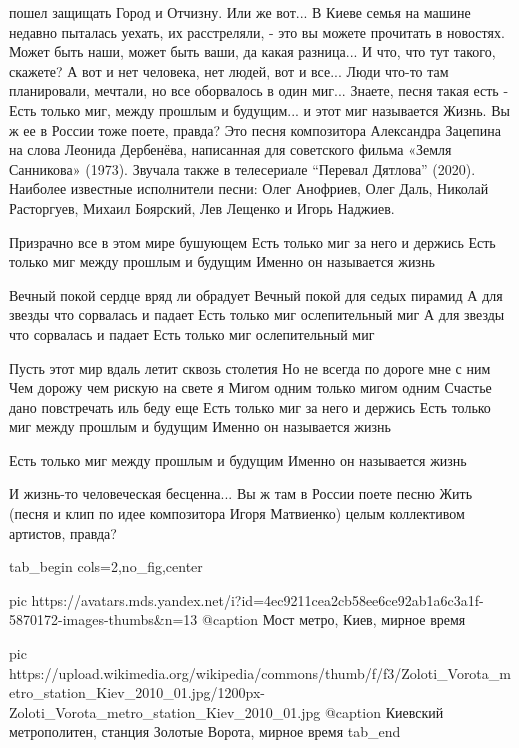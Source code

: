 пошел защищать Город и Отчизну. Или же вот... В Киеве семья на машине недавно
пыталась уехать, их расстреляли, - это вы можете прочитать в новостях. Может
быть наши, может быть ваши, да какая разница... И что, что тут такого, скажете?
А вот и нет человека, нет людей, вот и все... Люди что-то там планировали,
мечтали, но все оборвалось в один миг...  Знаете, песня такая есть - Есть
только миг, между прошлым и будущим... и этот миг называется Жизнь. Вы ж ее в
России тоже поете, правда?  Это песня композитора Александра Зацепина на слова
Леонида Дербенёва, написанная для советского фильма «Земля Санникова» (1973).
Звучала также в телесериале \enquote{Перевал Дятлова} (2020). Наиболее
известные исполнители песни: Олег Анофриев, Олег Даль, Николай Расторгуев,
Михаил Боярский, Лев Лещенко и Игорь Наджиев.

\raggedcolumns
\begin{multicols}{2} %
\setlength{\parindent}{0pt}
\obeycr
Призрачно все в этом мире бушующем
Есть только миг за него и держись
Есть только миг между прошлым и будущим
Именно он называется жизнь

Вечный покой сердце вряд ли обрадует
Вечный покой для седых пирамид
А для звезды что сорвалась и падает
Есть только миг ослепительный миг
А для звезды что сорвалась и падает
Есть только миг ослепительный миг

Пусть этот мир вдаль летит сквозь столетия
Но не всегда по дороге мне с ним
Чем дорожу чем рискую на свете я
Мигом одним только мигом одним
Счастье дано повстречать иль беду еще
Есть только миг за него и держись
Есть только миг между прошлым и будущим
Именно он называется жизнь

Есть только миг между прошлым и будущим
Именно он называется жизнь
\restorecr
\end{multicols} %

И жизнь-то человеческая бесценна... Вы ж там в России поете песню Жить (песня и
клип по идее композитора Игоря Матвиенко) целым коллективом артистов, правда?

\ifcmt
  tab_begin cols=2,no_fig,center

     pic https://avatars.mds.yandex.net/i?id=4ec9211cea2cb58ee6ce92ab1a6c3a1f-5870172-images-thumbs&n=13
		 @caption Мост метро, Киев, мирное время

		 pic https://upload.wikimedia.org/wikipedia/commons/thumb/f/f3/Zoloti_Vorota_metro_station_Kiev_2010_01.jpg/1200px-Zoloti_Vorota_metro_station_Kiev_2010_01.jpg
		 @caption Киевский метрополитен, станция Золотые Ворота, мирное время
  tab_end
\fi

